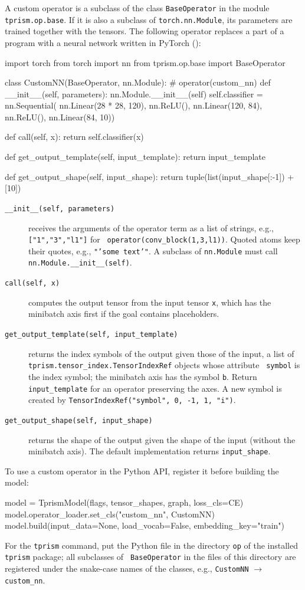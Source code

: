 \documentclass[a4paper]{report}
\begin{document}
A custom operator is a subclass of the class {\tt BaseOperator} in the module
{\tt tprism.op.base}.  If it is also a subclass of {\tt torch.nn.Module},
its parameters are trained together with the tensors.  The following operator replaces a part of a
program with a neural network written in PyTorch ():
\begin{pythoncode}
import torch
from torch import nn
from tprism.op.base import BaseOperator

class CustomNN(BaseOperator, nn.Module):      # operator(custom_nn)
    def __init__(self, parameters):
        nn.Module.__init__(self)
        self.classifier = nn.Sequential(
            nn.Linear(28 * 28, 120), nn.ReLU(),
            nn.Linear(120, 84), nn.ReLU(),
            nn.Linear(84, 10))

    def call(self, x):
        return self.classifier(x)

    def get_output_template(self, input_template):
        return input_template

    def get_output_shape(self, input_shape):
        return tuple(list(input_shape[:-1]) + [10])
\end{pythoncode}
\begin{description}
	\item[{\tt \_\_init\_\_(self, parameters)}] receives the arguments of the
	operator term as a list of strings, e.g., {\tt ["1","3","l1"]} for {\tt
		operator(conv\_block(1,3,l1))}.  Quoted atoms keep their quotes, e.g.,
	{\tt "'some text'"}.  A subclass of {\tt nn.Module} must call {\tt
		nn.Module.\_\_init\_\_(self)}.
	\item[{\tt call(self, x)}] computes the output tensor from the input
	tensor {\tt x}, which has the minibatch axis first if the goal contains
	placeholders.
	\item[{\tt get\_output\_template(self, input\_template)}] returns the
	index symbols of the output given those of the input, a list of {\tt
		tprism.tensor\_index.TensorIndexRef} objects whose attribute {\tt
		symbol} is the index symbol; the minibatch axis has the symbol {\tt b}.
	Return {\tt input\_template} for an operator preserving the axes.  A new
	symbol is created by {\tt TensorIndexRef("symbol", 0, -1, 1, "i")}.
	\item[{\tt get\_output\_shape(self, input\_shape)}] returns the shape of the
	output given the shape of the input (without the minibatch axis).  The
	default implementation returns {\tt input\_shape}.
\end{description}
To use a custom operator in the Python API, register it before building
the model:
\begin{pythoncode}
model = TprismModel(flags, tensor_shapes, graph, loss_cls=CE)
model.operator_loader.set_cls("custom_nn", CustomNN)
model.build(input_data=None, load_vocab=False, embedding_key="train")
\end{pythoncode}
For the {\tt tprism} command, put the Python file in the directory {\tt op}
of the installed {\tt tprism} package; all subclasses of {\tt
	BaseOperator} in the files of this directory are registered under the
snake-case names of the classes, e.g., {\tt CustomNN} $\rightarrow$ {\tt custom\_nn}.
\end{document}
